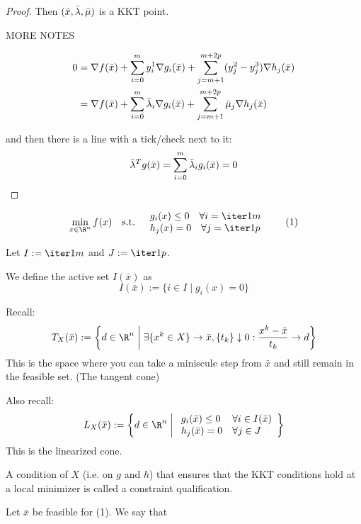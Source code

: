 \begin{proof}
	Then $(\bar x,\bar\lambda,\bar\mu)$ is a KKT point.

	MORE NOTES

	\begin{align*}
		0
		 & = \nabla f(\bar x)
		+\sum_{i=0}^my^1_i\nabla g_i(\bar x)
		+\sum_{j=m+1}^{m+2p}(y^2_j-y^3_j)\nabla h_j(\bar x) \\
		 & = \nabla f(\bar x)
		+\sum_{i=0}^m \bar\lambda_i\nabla g_i(\bar x)
		+\sum_{j=m+1}^{m+2p}\bar\mu_j\nabla h_j(\bar x)
	\end{align*}

	and then there is a line with a tick/check next to it:
	$$
		\bar\lambda^Tg(\bar x)=\sum_{i=0}^m\bar\lambda_ig_i(\bar x)=0
	$$
\end{proof}

\label{befc1f5}
\begin{equation*}
	\min_{x\in\R^n} f(x)\quad\text{s.t.}\quad\begin{array}{l}
		g_i(x)\leq0 \quad\forall i=\iter1m \\
		h_j(x)=0    \quad\forall j=\iter1p
	\end{array}
	\tag*{(1)}
\end{equation*}

Let $I:=\iter1m$ and $J:=\iter1p$.

We define the active set $I(\bar x)$ as
$$
	I(\bar x):=\{i\in I\mid g_i(x) = 0\}
$$

Recall:
$$
	T_X(\bar x):=\left\{
	d\in\R^n \;\middle\vert\; \exists \{x^k\in X\}\to\bar x,\{t_k\}\downarrow0:\frac{x^k-\bar x}{t_k}\to d
	\right\}
$$
This is the space where you can take a miniscule step from $\bar x$
and still remain in the feasible set. (The tangent cone)

Also recall:
$$
	L_X(\bar x):=\left\{
	d\in\R^n
	\;\middle\vert\;
	\begin{array}{l l}
		g_i(\bar x)\leq0 & \forall i\in I(\bar x) \\
		h_j(\bar x)=0    & \forall j\in J
	\end{array}
	\right\}
$$
This is the linearized cone.

\label{e8fa554}

A condition of $X$ (i.e. on $g$ and $h$) that ensures that the KKT
conditions hold at a local minimizer is called a constraint
qualification.

\label{fed784a}

Let $\bar x$ be feasible for (1). We say that

